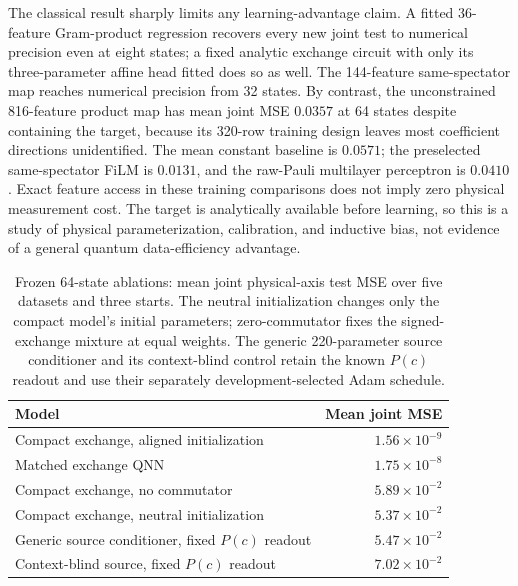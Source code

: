 \documentclass[pdflatex,sn-mathphys-num]{sn-jnl}
\begin{document}
The classical result sharply limits any learning-advantage claim. A fitted 36-feature Gram-product regression recovers every new joint test to numerical precision even at eight states; a fixed analytic exchange circuit with only its three-parameter affine head fitted does so as well. The 144-feature same-spectator map reaches numerical precision from 32 states. By contrast, the unconstrained 816-feature product map has mean joint MSE $0.0357$ at 64 states despite containing the target, because its 320-row training design leaves most coefficient directions unidentified. The mean constant baseline is $0.0571$; the preselected same-spectator FiLM is $0.0131$, and the raw-Pauli multilayer perceptron is $0.0410$. Exact feature access in these training comparisons does not imply zero physical measurement cost. The target is analytically available before learning, so this is a study of physical parameterization, calibration, and inductive bias, not evidence of a general quantum data-efficiency advantage.

\begin{table}[t]
\centering
\caption{Frozen 64-state ablations: mean joint physical-axis test MSE over five datasets and three starts. The neutral initialization changes only the compact model's initial parameters; zero-commutator fixes the signed-exchange mixture at equal weights. The generic 220-parameter source conditioner and its context-blind control retain the known $P(c)$ readout and use their separately development-selected Adam schedule.}\label{tab:ablation}
\small
\begin{tabular*}{\linewidth}{@{\extracolsep{\fill}}lr@{}}\toprule
Model & Mean joint MSE\\\midrule
Compact exchange, aligned initialization & $1.56\times10^{-9}$\\
Matched exchange QNN & $1.75\times10^{-8}$\\
Compact exchange, no commutator & $5.89\times10^{-2}$\\
Compact exchange, neutral initialization & $5.37\times10^{-2}$\\
Generic source conditioner, fixed $P(c)$ readout & $5.47\times10^{-2}$\\
Context-blind source, fixed $P(c)$ readout & $7.02\times10^{-2}$\\\bottomrule
\end{tabular*}
\end{table}
\end{document}
